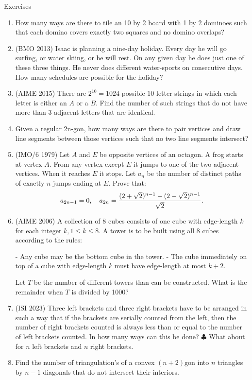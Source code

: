 \begin{xcb}{Exercises}
\begin{enumerate}
\item How many ways are there to tile an 10 by 2 board with 1 by 2 dominoes such that each domino covers exactly two squares and no domino overlaps?
\item (BMO 2013) Isaac is planning a nine-day holiday. Every day he will go surfing, or water skiing, or he will rest. On any given day he does just one of these three things. He never does different water-sports on consecutive days. How many schedules are possible for the holiday?
\item  (AIME 2015) There are $2^{10} = 1024$ possible 10-letter strings in which each letter is either an $A$ or a $B$. Find the number of such strings that do not have more than 3 adjacent letters that are identical.
\item Given a regular 2n-gon, how many ways are there to pair vertices and draw line segments between those vertices such that no two line segments intersect?
\item(IMO/6 1979) Let $A$ and $E$ be opposite vertices of an octagon. A frog starts at vertex $A.$ From any vertex except $E$ it jumps to one of the two adjacent vertices. When it reaches $E$ it stops. Let $a_n$ be the number of distinct paths of exactly $n$ jumps ending at $E$. Prove that:\[a_{2n-1}=0, \quad a_{2n}={(2+\sqrt2)^{n-1} - (2-\sqrt2)^{n-1} \over\sqrt2}.\]
\item (AIME 2006) A collection of 8 cubes consists of one cube with edge-length $k$ for each integer $k, 1 \le k \le 8.$ A tower is to be built using all 8 cubes according to the rules:\par
- Any cube may be the bottom cube in the tower.
- The cube immediately on top of a cube with edge-length $k$ must have edge-length at most $k+2.$\par
Let $T$ be the number of different towers than can be constructed. What is the remainder when $T$ is divided by 1000?
\item (ISI 2023) Three left brackets and three right brackets have to be arranged in such a way that if the brackets are serially counted from the left, then the number of right brackets counted is always less than or equal to the number of left brackets counted. In how many ways can this be done? $\clubsuit$ What about for $n$ left brackets and $n$ right brackets.  
\item  Find the number of triangulation's of a convex $(n + 2)$gon into $n$ triangles by $n-1$ diagonals that do not intersect their interiors.

\end{enumerate}
\end{xcb}
